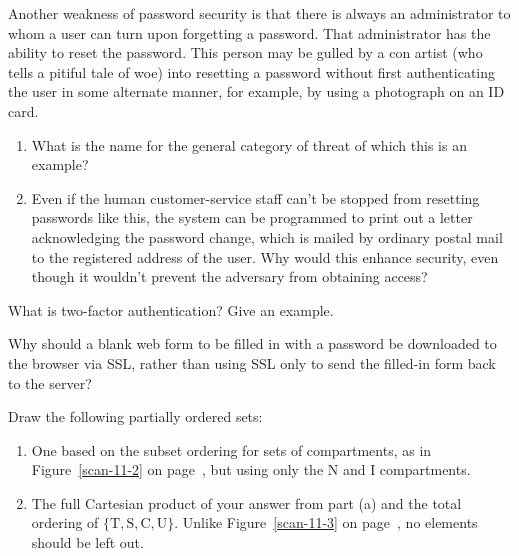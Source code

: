 \begin{chapterEnumerate}
\item
Another weakness of password security is that there is always an administrator
to whom a user can turn upon forgetting a password.  That administrator has the ability
to reset the password.  This person may be gulled by a con artist (who
tells a pitiful tale of woe) into resetting a password without first
authenticating the user in some alternate manner, for example, by using a
photograph on an ID card.
\begin{enumerate}
\item
What is the name for the general category of threat of which this is
an example?
\item
Even if the human customer-service staff can't be stopped from
resetting passwords like this, the system can be programmed to print
out a letter acknowledging the password change, which is mailed by
ordinary postal mail to the registered address of the user.  Why would
this enhance security, even though it wouldn't prevent the adversary
from obtaining access?
\end{enumerate}

\item
What is two-factor authentication?  Give an example.

\item
Why should a blank web form to be filled in with a password be
downloaded to the browser via SSL, rather than using SSL only to send
the filled-in form back to the server?

\item
Draw the following partially ordered sets:
\begin{enumerate}
\item
One based on the subset ordering for sets of compartments, as in
Figure~\ref{scan-11-2} on page~\pageref{scan-11-2}, but using only the N and I compartments.
\item
The full Cartesian product of your answer from part (a) and the total
ordering of $\lbrace \textrm{T}, \textrm{S}, \textrm{C}, \textrm{U} \rbrace$.  Unlike
Figure~\ref{scan-11-3} on page~\pageref{scan-11-3}, no elements should be left out.
\end{enumerate}


\end{chapterEnumerate}
